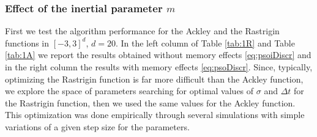 \documentclass{ims9x6}
\begin{document}
\subsubsection{Effect of the inertial parameter $m$ }
First we test the algorithm performance for the Ackley and the Rastrigin functions in $[-3, 3]^d$, $d=20$.  In the left column of Table \ref{tab:1R} and Table \ref{tab:1A} we report the results obtained without memory effects \eqref{eq:psoiDiscr} and in the right column the results with memory effects \eqref{eq:psoDiscr}. Since, typically, optimizing the Rastrigin function is far more difficult than the Ackley function, we explore the space of parameters searching for optimal values of $\sigma$ and $\Delta t$ for the Rastrigin function,  then we used the same values for the Ackley function. This optimization was done empirically through several simulations with simple variations of a given step size for the parameters.
\end{document}
